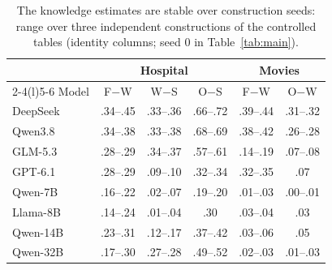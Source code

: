 \begin{table}[t]
  \caption{The knowledge estimates are stable over construction seeds: range over three independent constructions of the
  controlled tables (identity columns; seed 0 in Table~\ref{tab:main}).}
  \label{tab:seeds}
  \small
  \setlength{\tabcolsep}{2.5pt}
  \begin{tabular*}{\columnwidth}{@{\extracolsep{\fill}}l ccc cc@{}}
    \toprule
    & \multicolumn{3}{c}{Hospital} & \multicolumn{2}{c}{Movies} \\
    \cmidrule(lr){2-4}\cmidrule(l){5-6}
    Model & F$-$W & W$-$S & O$-$S & F$-$W & O$-$W \\
    \midrule
    DeepSeek & .34--.45 & .33--.36 & .66--.72 & .39--.44 & .31--.32 \\
    Qwen3.8 & .34--.38 & .33--.38 & .68--.69 & .38--.42 & .26--.28 \\
    GLM-5.3 & .28--.29 & .34--.37 & .57--.61 & .14--.19 & .07--.08 \\
    GPT-6.1 & .28--.29 & .09--.10 & .32--.34 & .32--.35 & .07 \\
    \midrule
    Qwen-7B & .16--.22 & .02--.07 & .19--.20 & .01--.03 & .00--.01 \\
    Llama-8B & .14--.24 & .01--.04 & .30 & .03--.04 & .03 \\
    Qwen-14B & .23--.31 & .12--.17 & .37--.42 & .03--.06 & .05 \\
    Qwen-32B & .17--.30 & .27--.28 & .49--.52 & .02--.03 & .01--.03 \\
    \bottomrule
  \end{tabular*}
\end{table}

